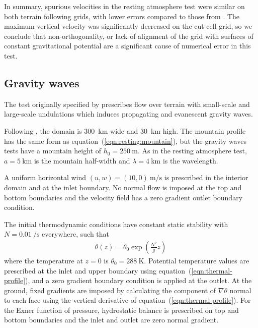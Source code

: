 \documentclass{ametsoc}
\begin{document}
In summary, spurious velocities in the resting atmosphere test were similar on both terrain following grids, with lower errors compared to those from \citet{klemp2011}.  The maximum vertical velocity was significantly decreased on the cut cell grid, so we conclude that non-orthogonality, or lack of alignment of the grid with surfaces of constant gravitational potential are a significant cause of numerical error in this test.


\subsection{Gravity waves}
\label{sec:gw}
The test originally specified by \citet{schaer2002} prescribes flow over terrain with small-scale and large-scale undulations which induces propagating and evanescent gravity waves.

Following \citet{melvin2010}, the domain is \SI{300}{\kilo\meter} wide and \SI{30}{\kilo\meter} high.
The mountain profile has the same form as equation~(\ref{eqn:resting:mountain}), but the gravity waves tests have a mountain height of $h_0 = \SI{250}{\meter}$.  As in the resting atmosphere test, $a = \SI{5}{\kilo\meter}$ is the mountain half-width and $\lambda = \SI{4}{\kilo\meter}$ is the wavelength.

A uniform horizontal wind $(u, w) = (10, 0)\:\si{\meter\per\second}$ is prescribed in the interior domain and at the inlet boundary.  No normal flow is imposed at the top and bottom boundaries and the velocity field has a zero gradient outlet boundary condition.

The initial thermodynamic conditions have constant static stability with $N = \SI{0.01}{\per\second}$ everywhere, such that
\begin{align}
	\theta(z) = \theta_0 \exp \left( \frac{N^2}{g} z \right) \label{eqn:thermal-profile}
\end{align}
where the temperature at $z=0$ is $\theta_0 = \SI{288}{\kelvin}$.
Potential temperature values are prescribed at the inlet and upper boundary using equation~(\ref{eqn:thermal-profile}), and a zero gradient boundary condition is applied at the outlet.  At the ground, fixed gradients are imposed by calculating the component of $\nabla \theta$ normal to each face using the vertical derivative of equation~(\ref{eqn:thermal-profile}).
For the Exner function of pressure, hydrostatic balance is prescribed on top and bottom boundaries and the inlet and outlet are zero normal gradient.
\end{document}
